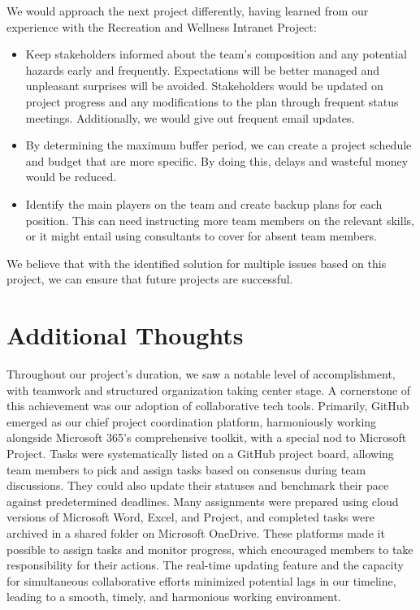 We would approach the next project differently, having learned from our experience with the Recreation and Wellness Intranet Project:

\begin{itemize}
    \item Keep stakeholders informed about the team's composition and any potential hazards early and frequently. Expectations will be better managed and unpleasant surprises will be avoided. Stakeholders would be updated on project progress and any modifications to the plan through frequent status meetings. Additionally, we would give out frequent email updates.
    \item By determining the maximum buffer period, we can create a project schedule and budget that are more specific. By doing this, delays and wasteful money would be reduced.
    \item Identify the main players on the team and create backup plans for each position. This can need instructing more team members on the relevant skills, or it might entail using consultants to cover for absent team members.
\end{itemize}

We believe that with the identified solution for multiple issues based on this project, we can ensure that future projects are successful.

\section{Additional Thoughts}

Throughout our project's duration, we saw a notable level of accomplishment, with teamwork and structured organization taking center stage. A cornerstone of this achievement was our adoption of collaborative tech tools. Primarily, GitHub emerged as our chief project coordination platform, harmoniously working alongside Microsoft 365's comprehensive toolkit, with a special nod to Microsoft Project. Tasks were systematically listed on a GitHub project board, allowing team members to pick and assign tasks based on consensus during team discussions. They could also update their statuses and benchmark their pace against predetermined deadlines. Many assignments were prepared using cloud versions of Microsoft Word, Excel, and Project, and completed tasks were archived in a shared folder on Microsoft OneDrive. These platforms made it possible to assign tasks and monitor progress, which encouraged members to take responsibility for their actions. The real-time updating feature and the capacity for simultaneous collaborative efforts minimized potential lags in our timeline, leading to a smooth, timely, and harmonious working environment.

